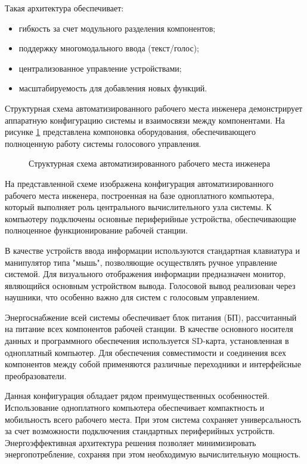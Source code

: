 Такая архитектура обеспечивает:
\begin{itemize}
	\item гибкость за счет модульного разделения компонентов;
	\item поддержку многомодального ввода (текст/голос);
	\item централизованное управление устройствами;
	\item масштабируемость для добавления новых функций.
\end{itemize}

Структурная схема автоматизированного рабочего места инженера демонстрирует аппаратную конфигурацию системы и взаимосвязи между компонентами. На рисунке \ref{fig:connection_scheme} представлена компоновка оборудования, обеспечивающего полноценную работу системы голосового управления.
\begin{figure}[H]
	\centering
	\caption{Структурная схема автоматизированного рабочего места инженера}
	\label{fig:connection_scheme}
\end{figure}

На представленной схеме изображена конфигурация автоматизированного рабочего места инженера, построенная на базе одноплатного компьютера, который выполняет роль центрального вычислительного узла системы. К компьютеру подключены основные периферийные устройства, обеспечивающие полноценное функционирование рабочей станции.

В качестве устройств ввода информации используются стандартная клавиатура и манипулятор типа "мышь", позволяющие осуществлять ручное управление системой. Для визуального отображения информации предназначен монитор, являющийся основным устройством вывода. Голосовой вывод реализован через наушники, что особенно важно для систем с голосовым управлением.

Энергоснабжение всей системы обеспечивает блок питания (БП), рассчитанный на питание всех компонентов рабочей станции. В качестве основного носителя данных и программного обеспечения используется SD-карта, установленная в одноплатный компьютер. Для обеспечения совместимости и соединения всех компонентов между собой применяются различные переходники и интерфейсные преобразователи.

Данная конфигурация обладает рядом преимущественных особенностей. Использование одноплатного компьютера обеспечивает компактность и мобильность всего рабочего места. При этом система сохраняет универсальность за счет возможности подключения стандартных периферийных устройств. Энергоэффективная архитектура решения позволяет минимизировать энергопотребление, сохраняя при этом необходимую вычислительную мощность.

